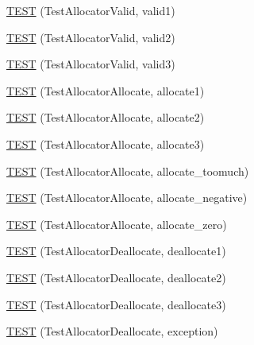 \begin{DoxyCompactItemize}
\item 
\hyperlink{TestAllocator_8c_09_09_aa030c002a0a4ec39efd41ec32a8a5f7c}{T\-E\-S\-T} (Test\-Allocator\-Valid, valid1)
\item 
\hyperlink{TestAllocator_8c_09_09_a1eb51325a4526d8fc5dfea45f8f41c06}{T\-E\-S\-T} (Test\-Allocator\-Valid, valid2)
\item 
\hyperlink{TestAllocator_8c_09_09_a2b4a5601315a39925c4b11733c76d13a}{T\-E\-S\-T} (Test\-Allocator\-Valid, valid3)
\item 
\hyperlink{TestAllocator_8c_09_09_a88fa712af9be1fe8601173aaad0d17a9}{T\-E\-S\-T} (Test\-Allocator\-Allocate, allocate1)
\item 
\hyperlink{TestAllocator_8c_09_09_a03ba40dc8d564df913b7819e88cbe6ab}{T\-E\-S\-T} (Test\-Allocator\-Allocate, allocate2)
\item 
\hyperlink{TestAllocator_8c_09_09_a9f9aefe29328486d62b3bec1b5c2bf16}{T\-E\-S\-T} (Test\-Allocator\-Allocate, allocate3)
\item 
\hyperlink{TestAllocator_8c_09_09_ab8b6a4d933c13070c1c57f3a907997f2}{T\-E\-S\-T} (Test\-Allocator\-Allocate, allocate\-\_\-toomuch)
\item 
\hyperlink{TestAllocator_8c_09_09_a7e55640d98d2c17ec4e4c03ce3b06828}{T\-E\-S\-T} (Test\-Allocator\-Allocate, allocate\-\_\-negative)
\item 
\hyperlink{TestAllocator_8c_09_09_a77b90ff75b91cecaba99f039f838b047}{T\-E\-S\-T} (Test\-Allocator\-Allocate, allocate\-\_\-zero)
\item 
\hyperlink{TestAllocator_8c_09_09_ab255499288b1ba1445e8762228aedbe5}{T\-E\-S\-T} (Test\-Allocator\-Deallocate, deallocate1)
\item 
\hyperlink{TestAllocator_8c_09_09_ac12a713e609cda2a46b4d78b858ee907}{T\-E\-S\-T} (Test\-Allocator\-Deallocate, deallocate2)
\item 
\hyperlink{TestAllocator_8c_09_09_afc15ba460c09b299d4a9eab06f5b1602}{T\-E\-S\-T} (Test\-Allocator\-Deallocate, deallocate3)
\item 
\hyperlink{TestAllocator_8c_09_09_ad21682e7c75eb2e95b5a7443db79df71}{T\-E\-S\-T} (Test\-Allocator\-Deallocate, exception)
\end{DoxyCompactItemize}


